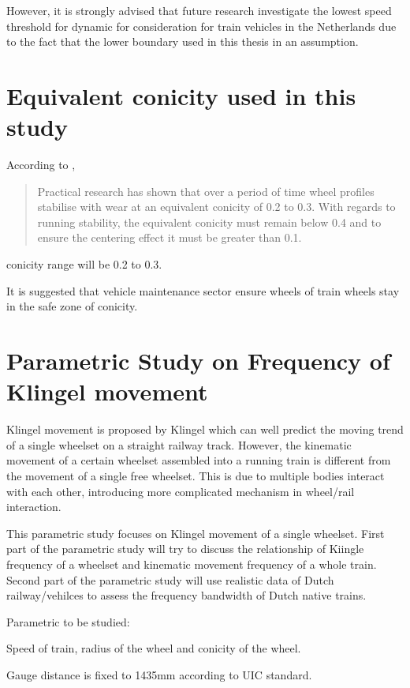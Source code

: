However, it is strongly advised that future research investigate the lowest speed threshold for dynamic for consideration for train vehicles in the Netherlands due to the fact that the lower boundary used in this thesis in an assumption.

\section{Equivalent conicity used in this study}
According to \cite[Section.2.6]{esveld2001modern}, 

\begin{quote}
    Practical research has shown that over a period of time wheel profiles stabilise with wear at an equivalent conicity of 0.2 to 0.3. With regards to running stability, the equivalent conicity must remain below 0.4 and to ensure the centering effect it must be greater than 0.1.
\end{quote}

conicity range will be 0.2 to 0.3.

It is suggested that vehicle maintenance sector ensure wheels of train wheels stay in the safe zone of conicity. 


\section{Parametric Study on Frequency of Klingel movement}

Klingel movement is proposed by Klingel which can well predict the moving trend of a single wheelset on a straight railway track. However, the kinematic movement of a certain wheelset assembled into a running train is different from the movement of a single free wheelset. This is due to multiple bodies interact with each other, introducing more complicated mechanism in wheel/rail interaction. 

This parametric study focuses on Klingel movement of a single wheelset. First part of the parametric study will try to discuss the relationship of Kiingle frequency of a wheelset and kinematic movement frequency of a whole train. Second part of the parametric study will use realistic data of Dutch railway/vehilces to assess the frequency bandwidth of Dutch native trains.

Parametric to be studied:

Speed of train, radius of the wheel and conicity of the wheel. 

Gauge distance is fixed to 1435mm according to UIC standard. 

